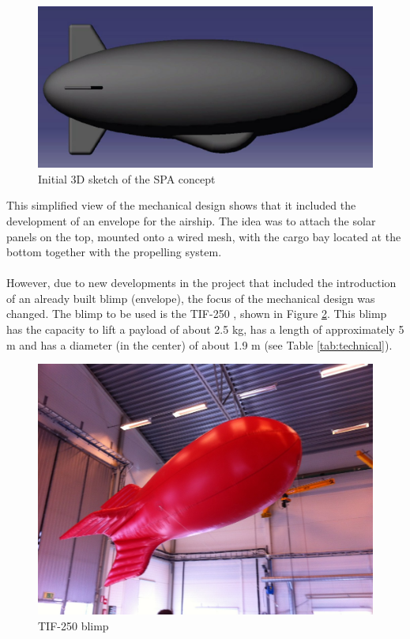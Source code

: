 \pagebreak

\begin{figure}[bht]
\centering
\includegraphics[scale=0.5]{figures/init.png}
\caption{Initial 3D sketch of the SPA concept}
\label{fig:init}
\end{figure}

\noindent
This simplified view of the mechanical design shows that it included the development of an envelope for the airship. The idea was to attach the solar panels on the top, mounted onto a wired mesh, with the cargo bay located at the bottom together with the propelling system.
\\
\\
However, due to new developments in the project that included the introduction of an already built blimp (envelope), the focus of the mechanical design was changed. The blimp to be used is the TIF-250 \cite{website:tif250}, shown in Figure \ref{fig:blimp}. This blimp has the capacity to lift a payload of about 2.5 kg, has a length of approximately 5 m and has a diameter (in the center) of about 1.9 m (see Table \ref{tab:technical}).

\vspace{1.0em}

\begin{figure}[bht]
\centering
\includegraphics[width=\textwidth]{figures/blimp.jpg}
\caption{TIF-250 blimp}
\label{fig:blimp}
\end{figure}

